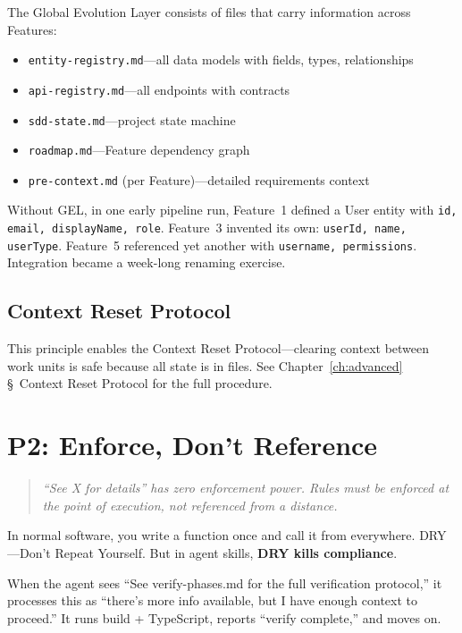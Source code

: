 \documentclass[11pt,a4paper,openright,twoside]{report}
\newcommand{\file}[1]{\texttt{#1}}
\begin{document}
The Global Evolution Layer consists of files that carry information across Features:

\begin{itemize}
  \item \file{entity-registry.md}---all data models with fields, types, relationships
  \item \file{api-registry.md}---all endpoints with contracts
  \item \file{sdd-state.md}---project state machine
  \item \file{roadmap.md}---Feature dependency graph
  \item \file{pre-context.md} (per Feature)---detailed requirements context
\end{itemize}

Without GEL, in one early pipeline run, Feature~1 defined a User entity with \texttt{id, email, displayName, role}. Feature~3 invented its own: \texttt{userId, name, userType}. Feature~5 referenced yet another with \texttt{username, permissions}. Integration became a week-long renaming exercise.

\subsection{Context Reset Protocol}

This principle enables the Context Reset Protocol---clearing context between work units is safe because all state is in files. See Chapter~\ref{ch:advanced} \S~Context Reset Protocol for the full procedure.


\section{P2: Enforce, Don't Reference}

\begin{quote}
\emph{``See X for details'' has zero enforcement power. Rules must be enforced at the point of execution, not referenced from a distance.}
\end{quote}

In normal software, you write a function once and call it from everywhere. DRY---Don't Repeat Yourself. But in agent skills, \textbf{DRY kills compliance}.

When the agent sees ``See verify-phases.md for the full verification protocol,'' it processes this as ``there's more info available, but I have enough context to proceed.'' It runs build + TypeScript, reports ``verify complete,'' and moves on.
\end{document}
